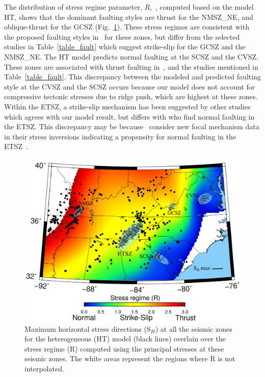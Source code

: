 \documentclass[draft,linenumbers]{agujournal2018}
\begin{document}
The distribution of stress regime parameter, $R$,~\citep{delvaux1997paleostress,simpson1997quantifying}, computed based on the model HT, shows that the dominant faulting styles are thrust for the NMSZ\_NE, and oblique-thrust for the GCSZ (Fig.~\ref{sigma1}). These stress regimes are consistent with the proposed faulting styles in~\citet{levandowski2018updated} for these zones, but differ from the selected studies in Table~\ref{table_fault} which suggest strike-slip for the GCSZ and the NMSZ\_NE.  
The HT model predicts normal faulting at the SCSZ and the CVSZ. These zones are associated with thrust faulting in~\citet{levandowski2018updated}, and the studies mentioned in Table~\ref{table_fault}. This discrepancy between the modeled and predicted faulting style at the CVSZ and the SCSZ occurs because our model does not account for compressive tectonic stresses due to ridge push, which are highest at these zones. Within the ETSZ, a strike-slip mechanism has been suggested by other studies~\citep[Table 2][]{mazzotti2010state, powell2016grenville} which agrees with our model result, but differs with \citet{levandowski2018updated} who find normal faulting in the ETSZ.  This discrepancy may be because~\citet{levandowski2018updated} consider new focal mechanism data in their stress inversions indicating a propensity for normal faulting in the ETSZ~\citep[also found in][]{cooley2015new}.

\begin{figure}[h!]
    \centering
    \includegraphics[width=0.75\linewidth]{figures/sigma1.png}
    \caption{Maximum horizontal stress directions (S$_H$) at all the seismic zones for the heterogeneous (HT) model (black lines) overlain over the stress regime (R) computed using the principal stresses at these seismic zones. The white areas represent the regions where R is not interpolated.}
    \label{sigma1}
\end{figure}
\end{document}

